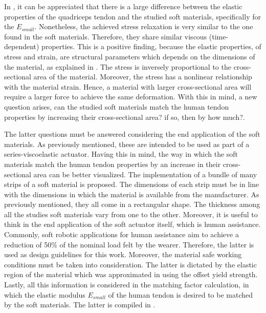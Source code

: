 In , it can be appreciated that there is a large difference between the elastic properties of the quadriceps tendon and the studied soft materials, specifically for the $E_{small}$. Nonetheless, the achieved stress relaxation is very similar to the one found in the soft materials. Therefore, they share similar viscous (time-dependent) properties. This is a positive finding, because the elastic properties, of stress and strain, are structural parameters which depends on the dimensions of the material, as explained in . The stress is inversely proportional to the cross-sectional area of the material. Moreover, the stress has a nonlinear relationship with the material strain. Hence, a material with larger cross-sectional area will require a larger force to achieve the same deformation. With this in mind, a new question arises, can the studied soft materials match the human tendon properties by increasing their cross-sectional area? if so, then by how much?.

The latter questions must be answered considering the end application of the soft materials. As previously mentioned, these are intended to be used as part of a series-viscoelastic actuator. Having this in mind, the way in which the soft materials match the human tendon properties by an increase in their cross-sectional area can be better visualized. The implementation of a bundle of many strips of a soft material is proposed. The dimensions of each strip must be in line with the dimensions in which the material is available from the manufacturer. As previously mentioned, they all come in a rectangular shape. The thickness among all the studies soft materials vary from one to the other. Moreover, it is useful to think in the end application of the soft actuator itself, which is human assistance. Commonly, soft robotic applications for human assistance aim to achieve a reduction of 50\% of the nominal load felt by the wearer. Therefore, the latter is used as design guidelines for this work. Moreover, the material safe working conditions must be taken into consideration. The latter is dictated by the elastic region of the material which was approximated in  using the offset yield strength. Lastly, all this information is considered in the matching factor calculation, in which the elastic modulus $E_{small}$ of the human tendon is desired to be matched by the soft materials. The latter is compiled in . 

